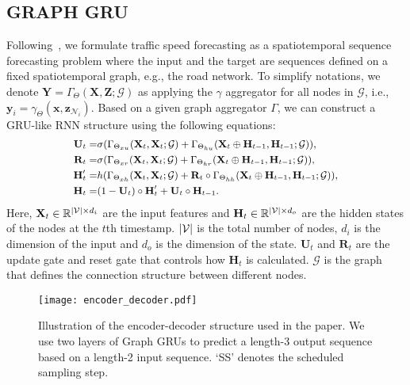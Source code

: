 \documentclass{article}
\DeclarePairedDelimiter\abs{\lvert}{\rvert}\DeclarePairedDelimiter\norm{\lVert}{\rVert}
\begin{document}
\subsection{GRAPH GRU}
	Following~\citep{lin2017structured}, we formulate traffic speed forecasting as a spatiotemporal sequence forecasting problem where the input and the target are sequences defined on a fixed spatiotemporal graph, e.g., the road network. To simplify notations, we denote $\mathbf{Y} = \Gamma_{\Theta}(\mathbf{X}, \mathbf{Z}; \mathcal{G})$ as applying the $\gamma$ aggregator for all nodes in $\mathcal{G}$, i.e., $\mathbf{y}_i = \gamma_{\Theta}(\mathbf{x}, \mathbf{z}_{\mathcal{N}_i})$. Based on a given graph aggregator $\Gamma$, we can construct a GRU-like RNN structure using the following equations:
	\begin{equation}
	\label{eq:graph_gru}
	\small{
		\begin{aligned}
		\mathbf{U}_t = &\sigma(\Gamma_{\Theta_{xu}}(\mathbf{X}_t, \mathbf{X}_t; \mathcal{G}) + \Gamma_{\Theta_{hu}}(\mathbf{X}_t \oplus \mathbf{H}_{t-1}, \mathbf{H}_{t-1}; \mathcal{G})),\\
		\mathbf{R}_t = &\sigma(\Gamma_{\Theta_{xr}}(\mathbf{X}_t, \mathbf{X}_t; \mathcal{G}) + \Gamma_{\Theta_{hr}}(\mathbf{X}_t \oplus \mathbf{H}_{t-1}, \mathbf{H}_{t-1}; \mathcal{G})),\\
		\mathbf{H}^\prime_t =& h(\Gamma_{\Theta_{xh}}(\mathbf{X}_t, \mathbf{X}_t; \mathcal{G})  + \mathbf{R}_t \circ \Gamma_{\Theta_{hh}}(\mathbf{X}_t \oplus \mathbf{H}_{t-1}, \mathbf{H}_{t-1}; \mathcal{G})),\\
		\mathbf{H}_t =& (1 - \mathbf{U}_t) \circ \mathbf{H}^\prime_t + \mathbf{U}_t \circ \mathbf{H}_{t-1}.
		\end{aligned}
	}
	\end{equation}
	Here, $\mathbf{X}_t \in \mathbb{R}^{\abs{\mathcal{V}} \times d_{i}}$ are the input features and $\mathbf{H}_t \in \mathbb{R}^{\abs{\mathcal{V}} \times d_o}$ are the hidden states of the nodes at the $t$th timestamp. $\abs{\mathcal{V}}$ is the total number of nodes, $d_i$ is the dimension of the input and $d_o$ is the dimension of the state. $\mathbf{U}_t$ and $\mathbf{R}_t$ are the update gate and reset gate that controls how $\mathbf{H}_t$ is calculated. $\mathcal{G}$ is the graph that defines the connection structure between different nodes.
	
	\begin{figure}[bt!]
		\centering
		\texttt{[image: encoder\_decoder.pdf]}
		\caption{Illustration of the encoder-decoder structure used in the paper. We use two layers of Graph GRUs to predict a length-3 output sequence based on a length-2 input sequence. `SS' denotes the scheduled sampling step.}
		\label{fig:encoder_decoder}
\end{figure}
	
\end{document}
